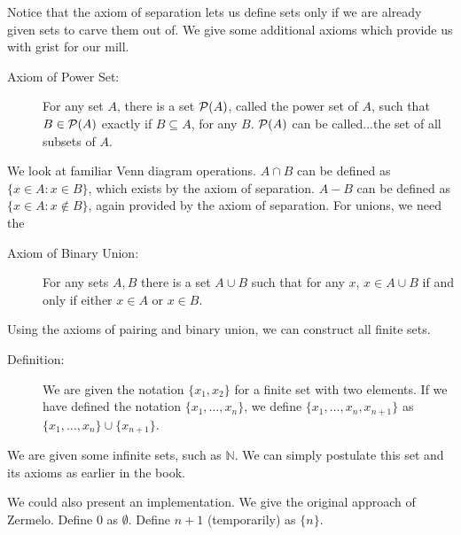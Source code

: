 \documentclass[12pt]{article}
\begin{document}
Notice that the axiom of separation lets us define sets only if we are already given sets to carve them out of.  We give some additional axioms which provide us with grist for our mill.

\begin{description}

\item[Axiom of Power Set:]  For any set $A$, there is a set ${\cal P}(A)$, called the power set of $A$, such that $B \in {\cal P}(A)$ exactly if $B \subseteq A$, for any $B$.  ${\cal P}(A)$ can be called...the set of all subsets of $A$.

\end{description}

We look at familiar Venn diagram operations.  $A \cap B$ can be defined as $\{x \in A:x \in B\}$, which exists by the axiom of separation.  $A - B$ can be defined as $\{x \in A: x \not\in B\}$, again provided by the axiom of separation.  For unions, we need the

\begin{description}

\item[Axiom of Binary Union:]  For any sets $A,B$ there is a set $A \cup B$ such that for any $x$, $x \in A \cup B$ if and only if either $x \in A$ or $x \in B$.

\end{description}

Using the axioms of pairing and binary union, we can construct all finite sets.

\begin{description}

\item[Definition:]  We are given the notation $\{x_1,x_2\}$ for a finite set with two elements.  If we have defined
the notation $\{x_1,\ldots,x_n\}$, we define $\{x_1,\ldots,x_n,x_{n+1}\}$  as $\{x_1,\ldots,x_n\} \cup \{x_{n+1}\}$.

\end{description}

We are given some infinite sets, such as $\mathbb N$.  We can simply postulate this set and its axioms as earlier in the book.

We could also present an implementation.  We give the original approach of Zermelo.  Define 0 as $\emptyset$.
Define $n+1$ (temporarily) as $\{n\}$.
\end{document}
